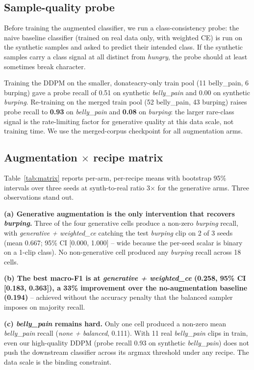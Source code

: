 \documentclass[10pt]{article}
\begin{document}
\subsection{Sample-quality probe}\label{sec:probe}
Before training the augmented classifier, we run a class-consistency probe: the naive baseline classifier (trained on real data only, with weighted CE) is run on the synthetic samples and asked to predict their intended class. If the synthetic samples carry a class signal at all distinct from \textit{hungry}, the probe should at least sometimes break character.

Training the DDPM on the smaller, donateacry-only train pool (11 belly\_pain, 6 burping) gave a probe recall of 0.51 on synthetic \textit{belly\_pain} and 0.00 on synthetic \textit{burping}. Re-training on the merged train pool (52 belly\_pain, 43 burping) raises probe recall to \textbf{0.93} on \textit{belly\_pain} and \textbf{0.08} on \textit{burping}: the larger rare-class signal is the rate-limiting factor for generative quality at this data scale, not training time. We use the merged-corpus checkpoint for all augmentation arms.

\subsection{Augmentation $\times$ recipe matrix}\label{sec:matrix}
Table~\ref{tab:matrix} reports per-arm, per-recipe means with bootstrap 95\% intervals over three seeds at synth-to-real ratio 3$\times$ for the generative arms. Three observations stand out.

\textbf{(a) Generative augmentation is the only intervention that recovers \textit{burping}.} Three of the four generative cells produce a non-zero \textit{burping} recall, with \textit{generative + weighted\_ce} catching the test \textit{burping} clip on 2 of 3 seeds (mean 0.667; 95\% CI [0.000, 1.000] -- wide because the per-seed scalar is binary on a 1-clip class). No non-generative cell produced any \textit{burping} recall across 18 cells.

\textbf{(b) The best macro-F1 is at \textit{generative + weighted\_ce} (0.258, 95\% CI [0.183, 0.363]), a 33\% improvement over the no-augmentation baseline (0.194)} -- achieved without the accuracy penalty that the balanced sampler imposes on majority recall.

\textbf{(c) \textit{belly\_pain} remains hard.} Only one cell produced a non-zero mean \textit{belly\_pain} recall (\textit{none + balanced}, 0.111). With 11 real \textit{belly\_pain} clips in train, even our high-quality DDPM (probe recall 0.93 on synthetic \textit{belly\_pain}) does not push the downstream classifier across its argmax threshold under any recipe. The data scale is the binding constraint.
\end{document}

